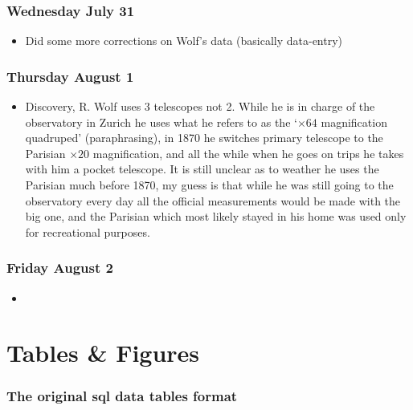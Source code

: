 \documentclass[12pt]{article}
\begin{document}
\subsubsection{Wednesday July 31}
\begin{itemize}
    \item Did some more corrections on Wolf's data (basically data-entry)
\end{itemize}

\subsubsection{Thursday August 1}
\begin{itemize}
    \item Discovery, R. Wolf uses 3 telescopes not 2. While he is in charge of the observatory in Zurich he uses what he refers to as the `$\times 64$ magnification quadruped' (paraphrasing), in 1870 he switches primary telescope to the Parisian $\times 20$ magnification, and all the while when he goes on trips he takes with him a pocket telescope. It is still unclear as to weather he uses the Parisian much before 1870, my guess is that while he was still going to the observatory every day all the official measurements would be made with the big one, and the Parisian which most likely stayed in his home was used only for recreational purposes.
\end{itemize}

\subsubsection{Friday August 2}
\begin{itemize}
    \item 
\end{itemize}


\section{Tables & Figures}

\subsubsection{The original sql data tables format}
\end{document}
